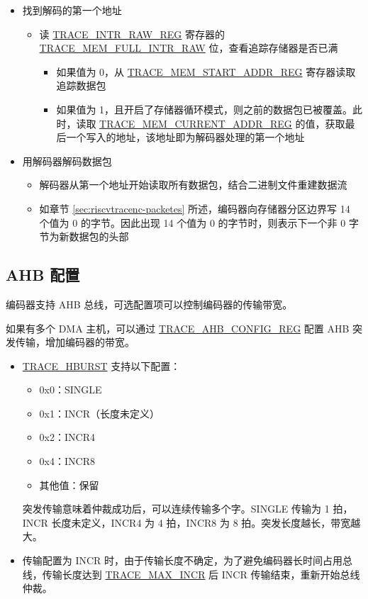 \documentclass[main\_\_CN.tex]{subfiles}
\begin{document}
\begin{itemize}
    \item 找到解码的第一个地址
        \begin{itemize}
            \item 读 \hyperref[regdesc:TRACEINTRRAWREG]{TRACE\_INTR\_RAW\_REG} 寄存器的 \hyperref[fielddesc:TRACEMEMFULLINTRRAW]{TRACE\_MEM\_FULL\_INTR\_RAW} 位，查看追踪存储器是否已满
            \begin{itemize}
                \item 如果值为 0，从 \hyperref[regdesc:TRACEMEMSTARTADDRREG]{TRACE\_MEM\_START\_ADDR\_REG} 寄存器读取追踪数据包
                \item 如果值为 1，且开启了存储器循环模式，则之前的数据包已被覆盖。此时，读取 \hyperref[regdesc:TRACEMEMCURRENTADDRREG]{TRACE\_MEM\_CURRENT\_ADDR\_REG} 的值，获取最后一个写入的地址，该地址即为解码器处理的第一个地址
            \end{itemize}
        \end{itemize}

    \item 用解码器解码数据包
        \begin{itemize}
            \item 解码器从第一个地址开始读取所有数据包，结合二进制文件重建数据流
            \item 如章节 \ref{sec:riscvtracenc-packetes} 所述，编码器向存储器分区边界写 14 个值为 0 的字节。因此出现 14 个值为 0 的字节时，则表示下一个非 0 字节为新数据包的头部
        \end{itemize}
\end{itemize}

\subsection{AHB 配置}

\chipname{} 编码器支持 AHB 总线，可选配置项可以控制编码器的传输带宽。

如果有多个 DMA 主机，可以通过 \hyperref[regdesc:TRACEAHBCONFIGREG]{TRACE\_AHB\_CONFIG\_REG} 配置 AHB 突发传输，增加编码器的带宽。
\begin{itemize}
    \item \hyperref[fielddesc:TRACEHBURST]{TRACE\_HBURST} 支持以下配置：
        \begin{itemize}
            \item 0x0：SINGLE
            \item 0x1：INCR（长度未定义）
            \item 0x2：INCR4
            \item 0x4：INCR8
            \item 其他值：保留
        \end{itemize}
        突发传输意味着仲裁成功后，可以连续传输多个字。SINGLE 传输为 1 拍，INCR 长度未定义，INCR4 为 4 拍，INCR8 为 8 拍。突发长度越长，带宽越大。

    \item 传输配置为 INCR 时，由于传输长度不确定，为了避免编码器长时间占用总线，传输长度达到 \hyperref[fielddesc:TRACEMAXINCR]{TRACE\_MAX\_INCR} 后 INCR 传输结束，重新开始总线仲裁。
\end{itemize}
\end{document}

